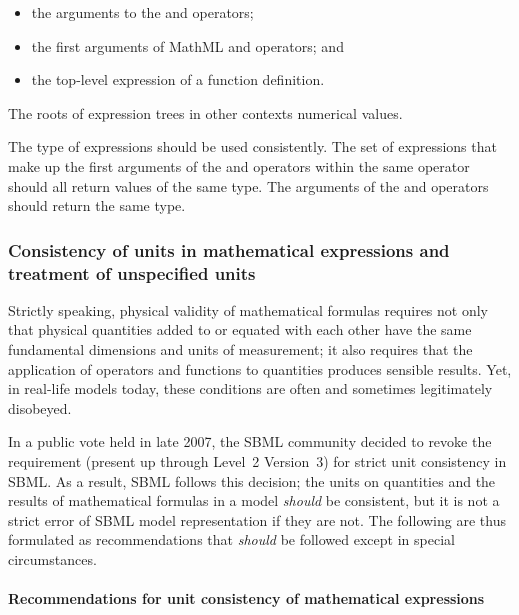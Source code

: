 \begin{itemize}\setlength{\parskip}{-0.2ex}

\item the arguments to the  and  operators;

\item the first arguments of MathML  and 
operators; and

\item the top-level expression of a function definition.

\end{itemize}

The roots of expression trees in other contexts 
numerical values.

The type of expressions should be used consistently.  The set of
expressions that make up the first arguments of the 
and  operators within the same 
operator should all return values of the same type. The arguments
of the  and  operators should return the same
type.


\subsubsection{Consistency of units in mathematical expressions
  and treatment of unspecified units}
\label{sec:operator-arg-types}
\label{sec:unit-consistency}

Strictly speaking, physical validity of mathematical formulas
requires not only that physical quantities added to or equated
with each other have the same fundamental dimensions and units of
measurement; it also requires that the application of operators
and functions to quantities produces sensible results.  Yet, in
real-life models today, these conditions are often and sometimes
legitimately disobeyed.

In a public vote held in late 2007, the SBML community decided to
revoke the requirement (present up through Level~2 Version~3) for
strict unit consistency in SBML.  As a result, SBML \thisL follows
this decision; the units on quantities and the results of
mathematical formulas in a model \emph{should} be consistent, but
it is not a strict error of SBML model representation if they are
not.  The following are thus formulated as recommendations that
\emph{should} be followed except in special circumstances.


\paragraph{Recommendations for unit consistency of mathematical expressions}

